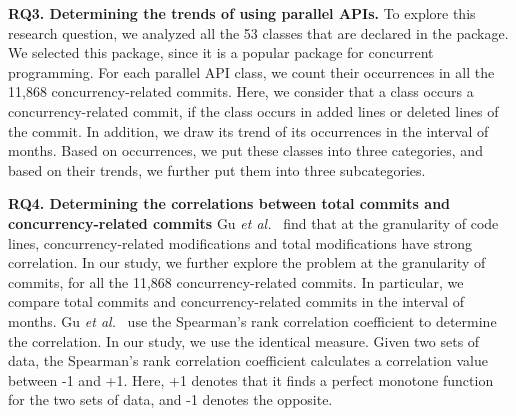 \textbf{RQ3. Determining the trends of using parallel APIs.} To explore this research question, we analyzed all the 53 classes that are declared in the  package. We selected this package, since it is a popular package for concurrent programming. For each parallel API class, we count their occurrences in all the 11,868 concurrency-related commits. Here, we consider that a class occurs a concurrency-related commit, if the class occurs in added lines or deleted lines of the commit. In addition, we draw its trend of its occurrences in the interval of months. Based on occurrences, we put these classes into three categories, and based on their trends, we further put them into three subcategories. %

\textbf{RQ4. Determining the correlations between total commits and concurrency-related commits} Gu \emph{et al.}~\cite{conf/sigsoft/GuJSZL15} find that at the granularity of code lines, concurrency-related modifications and total modifications have strong correlation. In our study, we further explore the problem at the granularity of commits, for all the 11,868 concurrency-related commits. In particular, we compare total commits and concurrency-related commits in the interval of months. Gu \emph{et al.}~\cite{conf/sigsoft/GuJSZL15} use the Spearman's rank correlation coefficient to determine the correlation. In our study, we use the identical measure. Given two sets of data, the Spearman's rank
correlation coefficient calculates a correlation value between -1 and +1. Here, +1 denotes that it finds a perfect monotone function for the two sets of data, and -1 denotes the opposite.





